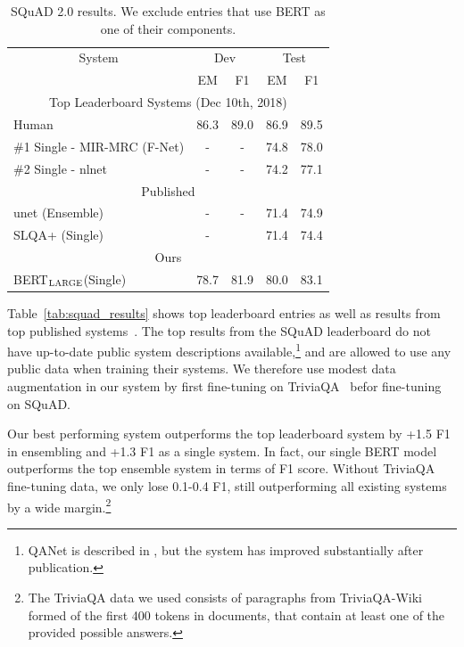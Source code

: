 \documentclass[11pt,a4paper]{article}
\newcommand\bertlarge{BERT$_{\small \textsc{LARGE}}$\xspace}
\begin{document}
\begin{table}[t]
\begin{center}
{\small
\begin{tabular}{@{}lcccc@{}}
  \toprule
  \multicolumn{1}{c}{System} & \multicolumn{2}{c}{Dev} & \multicolumn{2}{c}{Test} \\
  & EM & F1 & EM & F1 \\
  \midrule

\multicolumn{5}{c}{Top Leaderboard Systems (Dec 10th, 2018)} \\
  Human                & 86.3 & 89.0 & 86.9& 89.5 \\ 
  \#1 Single - MIR-MRC (F-Net)   & - & - & 74.8 & 78.0 \\ 
  \#2 Single - nlnet   & - & - & 74.2 & 77.1 \\ 
  \midrule
  \multicolumn{5}{c}{Published}     \\
 unet (Ensemble) & - & -  & 71.4  & 74.9 \\ 
 SLQA+ (Single) & - & & 71.4 & 74.4\\
  \midrule
  \multicolumn{5}{c}{Ours} \\
  \bertlarge (Single)    & 78.7 & 81.9 & 80.0   &  83.1
 \\ 

\bottomrule
\end{tabular}
} %
\end{center}
\caption{\label{tab:squad2_results} SQuAD 2.0 results. We exclude entries that use BERT as one of their components.}
\end{table}



Table~\ref{tab:squad_results} shows top leaderboard entries as well as results from top published systems~\cite{bidaf,clark-gardner:2018:_simpl,peters-etal:2018:_deep,hu2017reinforced}.
The top results from the SQuAD leaderboard do not have up-to-date public system descriptions available,\footnote{QANet is described in , but the system has improved substantially after publication.} and are allowed to use any public data when training their systems. We therefore use modest data augmentation in our system by first fine-tuning on TriviaQA~\cite{joshi-etal:2017:_triviaq} befor fine-tuning on SQuAD.

Our best performing system outperforms the top leaderboard system by +1.5 F1 in ensembling and +1.3 F1 as a single system. In fact, our single BERT model outperforms the top ensemble system in terms of F1 score. Without TriviaQA fine-tuning data, we only lose 0.1-0.4 F1, still outperforming all existing systems by a wide margin.\footnote{The TriviaQA data we used consists of paragraphs from TriviaQA-Wiki formed of the first 400 tokens in documents, that contain at least one of the provided possible answers.}
\end{document}
